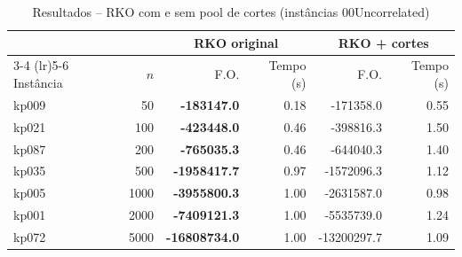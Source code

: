 \begin{table}[htbp]
\centering
\caption{Resultados -- RKO com e sem pool de cortes (instâncias 00Uncorrelated)}
\label{tab:cuts}
\begin{tabular}{lrrrrr}
\toprule
 & & \multicolumn{2}{c}{\textbf{RKO original}} & \multicolumn{2}{c}{\textbf{RKO + cortes}} \\
\cmidrule(lr){3-4} \cmidrule(lr){5-6}
Instância & $n$ & F.O. & Tempo (s) & F.O. & Tempo (s) \\
\midrule
kp009 & 50 & \textbf{-183147.0} & 0.18 & -171358.0 & 0.55 \\
kp021 & 100 & \textbf{-423448.0} & 0.46 & -398816.3 & 1.50 \\
kp087 & 200 & \textbf{-765035.3} & 0.46 & -644040.3 & 1.40 \\
kp035 & 500 & \textbf{-1958417.7} & 0.97 & -1572096.3 & 1.12 \\
kp005 & 1000 & \textbf{-3955800.3} & 1.00 & -2631587.0 & 0.98 \\
kp001 & 2000 & \textbf{-7409121.3} & 1.00 & -5535739.0 & 1.24 \\
kp072 & 5000 & \textbf{-16808734.0} & 1.00 & -13200297.7 & 1.09 \\
\bottomrule
\end{tabular}
\end{table}
